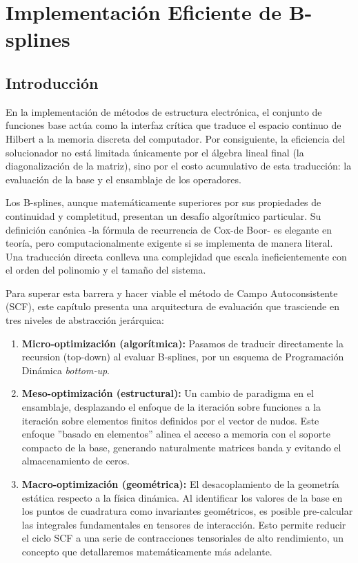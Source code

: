 \chapter{Implementación Eficiente de B-splines}
\label{ch:imp_splines}


\section{Introducción}

En la implementación de métodos de estructura electrónica, el conjunto de funciones base actúa como la interfaz crítica que traduce el espacio continuo de Hilbert a la memoria discreta del computador. Por consiguiente, la eficiencia del solucionador no está limitada únicamente por el álgebra lineal final (la diagonalización de la matriz), sino por el costo acumulativo de esta traducción: la evaluación de la base y el ensamblaje de los operadores.

Los B-splines, aunque matemáticamente superiores por sus propiedades de continuidad y completitud, presentan un desafío algorítmico particular. Su definición canónica -la fórmula de recurrencia de Cox-de Boor- es elegante en teoría, pero computacionalmente exigente si se implementa de manera literal. Una traducción directa conlleva una complejidad que escala ineficientemente con el orden del polinomio y el tamaño del sistema.

Para superar esta barrera y hacer viable el método de Campo Autoconsistente (SCF), este capítulo presenta una arquitectura de evaluación que trasciende en tres niveles de abstracción jerárquica:

\begin{enumerate}
\item \textbf{Micro-optimización (algorítmica):} Pasamos de traducir directamente la recursion (top-down) al evaluar B-splines, por un esquema de Programación Dinámica \textit{bottom-up}.
\item \textbf{Meso-optimización (estructural):} Un cambio de paradigma en el ensamblaje, desplazando el enfoque de la iteración sobre funciones a la iteración sobre elementos finitos definidos por el vector de nudos. Este enfoque ”basado en elementos” alinea el acceso a memoria con el soporte compacto de la base, generando naturalmente matrices banda y evitando el almacenamiento de ceros.
\item \textbf{Macro-optimización (geométrica):} El desacoplamiento de la geometría estática respecto a la física dinámica. Al identificar los valores de la base en los puntos de cuadratura como invariantes geométricos, es posible pre-calcular las integrales fundamentales en tensores de interacción. Esto permite reducir el ciclo SCF a una serie de contracciones tensoriales de alto rendimiento, un concepto que detallaremos matemáticamente más adelante.
\end{enumerate}

